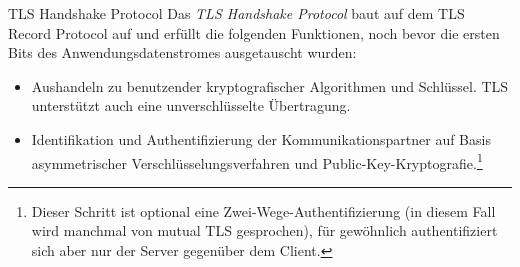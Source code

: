 \begin{defi}{TLS Handshake Protocol}
    Das \emph{TLS Handshake Protocol} baut auf dem TLS Record Protocol auf und erfüllt die folgenden Funktionen, noch bevor die ersten Bits des Anwendungsdatenstromes ausgetauscht wurden:
    \begin{itemize}
        \item Aushandeln zu benutzender kryptografischer Algorithmen und Schlüssel. TLS unterstützt auch eine unverschlüsselte Übertragung.
        \item Identifikation und Authentifizierung der Kommunikationspartner auf Basis asymmetrischer Verschlüsselungsverfahren und Public-Key-Kryptografie.\footnote{Dieser Schritt ist optional eine Zwei-Wege-Authentifizierung (in diesem Fall wird manchmal von mutual TLS gesprochen), für gewöhnlich authentifiziert sich aber nur der Server gegenüber dem Client.}
    \end{itemize}


\end{defi}
